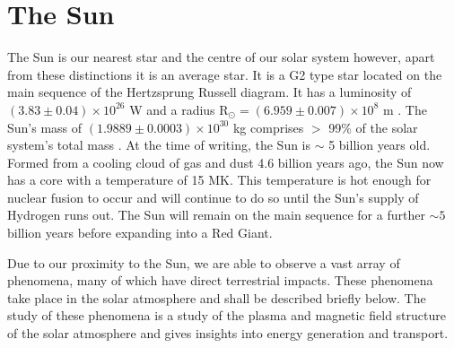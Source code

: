 \section{The Sun}
The Sun is our nearest star and the centre of our solar system however, apart from these distinctions it is an average star. It is a G2 type star located on the main sequence of the Hertzsprung Russell diagram. It has a luminosity of $(3.83 \pm 0.04) \times 10^{26}$ W and a radius R$_\odot = (6.959 \pm 0.007) \times 10^8$ m \citep{Foukal2004}. The Sun's mass of $(1.9889 \pm 0.0003) \times 10^{30}$ kg comprises $>$ 99\% of the solar system's total mass \citep{Foukal2004}. At the time of writing, the Sun is $\sim$ 5 billion years old. Formed from a cooling cloud of gas and dust 4.6 billion years ago, the Sun now has a core with a temperature of 15 MK. This temperature is hot enough for nuclear fusion to occur and will continue to do so until the Sun's supply of Hydrogen runs out. The Sun will remain on the main sequence for a further $\sim 5$ billion years before expanding into a Red Giant. %

Due to our proximity to the Sun, we are able to observe a vast array of phenomena, many of which have direct terrestrial impacts. These phenomena take place in the solar atmosphere and shall be described briefly below. The study of these phenomena is a study of the plasma and magnetic field structure of the solar atmosphere and gives insights into energy generation and transport.
